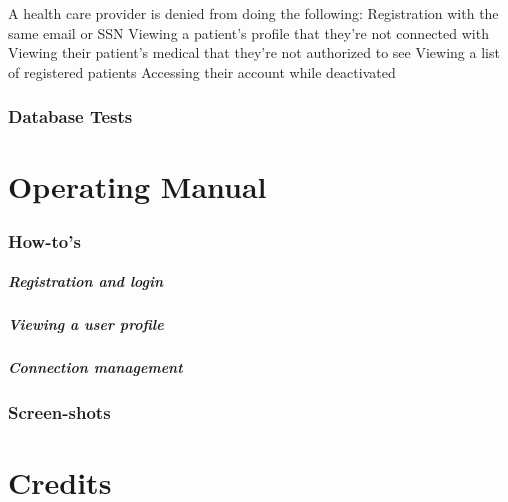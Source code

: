 \documentclass[12pt]{report}
\begin{document}
A health care provider is denied from doing the following:
\bullet Registration with the same email or SSN 
\bullet Viewing a patient's profile that they're not connected with
\bullet Viewing their patient's medical that they're not authorized to see
\bullet Viewing a list of registered patients
\bullet Accessing their account while deactivated

\subsection{Database Tests}


\chapter{Operating Manual}
\subsection{How-to's}
\paragraph{Registration and login}
\paragraph{Viewing a user profile}
\paragraph{Connection management}

\subsection{Screen-shots}

\chapter{Credits}
\end{document}

